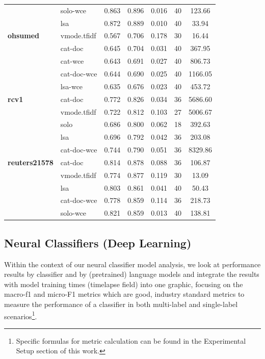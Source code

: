 \documentclass[final]{clv2025}
\begin{document}
\begin{table}[h!]
\begin{tabular}{@{}p{2.2cm} p{2.6cm} c c c c c@{}}
 & solo-wce & 0.863 & 0.896 & 0.016 & 40 & 123.66 \\
 & lsa & 0.872 & 0.889 & 0.010 & 40 & 33.94 \\
\midrule
\textbf{ohsumed} & vmode.tfidf & 0.567 & 0.706 & 0.178 & 30 & 16.44 \\
 & cat-doc & 0.645 & 0.704 & 0.031 & 40 & 367.95 \\
 & cat-wce & 0.643 & 0.691 & 0.027 & 40 & 806.73 \\
 & cat-doc-wce & 0.644 & 0.690 & 0.025 & 40 & 1166.05 \\
 & lsa-wce & 0.635 & 0.676 & 0.023 & 40 & 453.72 \\
\midrule
\textbf{rcv1} & cat-doc & 0.772 & 0.826 & 0.034 & 36 & 5686.60 \\
 & vmode.tfidf & 0.722 & 0.812 & 0.103 & 27 & 5006.67 \\
 & solo & 0.686 & 0.800 & 0.062 & 18 & 392.63 \\
 & lsa & 0.696 & 0.792 & 0.042 & 36 & 203.08 \\
 & cat-doc-wce & 0.744 & 0.790 & 0.051 & 36 & 8329.86 \\
\midrule
\textbf{reuters21578} & cat-doc & 0.814 & 0.878 & 0.088 & 36 & 106.87 \\
 & vmode.tfidf & 0.774 & 0.877 & 0.119 & 30 & 13.09 \\
 & lsa & 0.803 & 0.861 & 0.041 & 40 & 50.43 \\
 & cat-doc-wce & 0.778 & 0.859 & 0.114 & 36 & 218.73 \\
 & solo-wce & 0.821 & 0.859 & 0.013 & 40 & 138.81 \\
\bottomrule
\end{tabular}
\end{table}



\subsection{Neural Classifiers (Deep Learning)}

Within the context of our neural classifier model analysis, we look at performance results by classifier and by (pretrained) language models and integrate the results with model training times (timelapse field) into one graphic, focusing on the macro-f1 and micro-F1 metrics which are good, industry standard metrics to measure the performance of a classifier in both multi-label and single-label scenarios\footnote{Specific formulas for metric calculation can be found in the Experimental Setup section of this work.}.  
\end{document}
